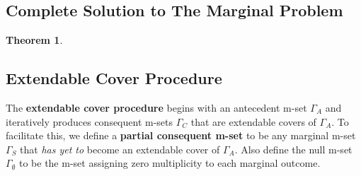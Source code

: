 \documentclass[aps, 10pt, english, twoside, pra, nofootinbib, longbibliography]{revtex4-1}
\theoremstyle{plain}
\newtheorem{theorem}{Theorem}
\newtheorem{corollary}[theorem]{Corollary}
\theoremstyle{definition}
\theoremstyle{remark}
\newcommand{\ext}{\mathrel{\Yleft}}
\newcommand{\mscenario}{\mathcal{M}}
\newcommand{\jointvar}{\mathcal{J}}
\newcommand{\mext}[1]{E_{#1}}
\newcommand{\mul}[1]{\Gamma_{#1}}
\newcommand{\isext}[2]{\delta_{#1 \ext #2}}
\newcommand{\term}[1]{\textcolor{Mahogany}{\textbf{#1}}}
\begin{document}




    \subsection{Complete Solution to The Marginal Problem}
    \begin{theorem}
        \label{thm:complete_solution_ext_cover}
    \end{theorem}
    \subsection{Extendable Cover Procedure}
    The \term{extendable cover procedure} begins with an antecedent m-set $\mul{A}$ and iteratively produces consequent m-sets $\mul{C}$ that are extendable covers of $\mul{A}$. To facilitate this, we define a \term{partial consequent m-set} to be any marginal m-set $\mul{S}$ that \textit{has yet to} become an extendable cover of $\mul{A}$. Also define the null m-set $\mul{\emptyset}$ to be the m-set assigning zero multiplicity to each marginal outcome.
\end{document}
